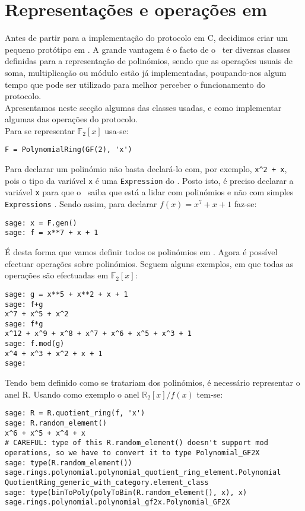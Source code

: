 \section{Representações e operações em \sage}
Antes de partir para a implementação do protocolo em \textsf{C}, decidimos criar um pequeno protótipo em \sage. A grande vantagem é o facto de o \sage\ ter diversas classes definidas para a representação de polinómios, sendo que as operações usuais de soma, multiplicação ou módulo estão já implementadas, poupando-nos algum tempo que pode ser utilizado para melhor perceber o funcionamento do protocolo. \\
Apresentamos neste secção algumas das classes usadas, e como implementar algumas das operações do protocolo.\\
Para se representar $\mathbb{F}_2[x]$ usa-se:
\begin{lstlisting}[style=sage]
F = PolynomialRing(GF(2), 'x')
\end{lstlisting}
Para declarar um polinómio não basta declará-lo com, por exemplo, \verb|x^2 + x|, pois o tipo da variável \verb|x| é uma \verb|Expression| do \sage. Posto isto, é preciso declarar a variável \verb|x| para que o \sage\ saiba que está a lidar com polinómios e não com simples \verb|Expressions| \sage. Sendo assim, para declarar $f(x) = x^7 + x + 1$ faz-se:
\begin{lstlisting}[style=sage]
sage: x = F.gen()
sage: f = x**7 + x + 1
\end{lstlisting}
É desta forma que vamos definir todos os polinómios em \sage. Agora é possível efectuar operações sobre polinómios. Seguem alguns exemplos, em que todas as operações são efectuadas em $\mathbb{F}_2[x]$:
\begin{lstlisting}[style=sage]
sage: g = x**5 + x**2 + x + 1
sage: f+g
x^7 + x^5 + x^2
sage: f*g
x^12 + x^9 + x^8 + x^7 + x^6 + x^5 + x^3 + 1
sage: f.mod(g)
x^4 + x^3 + x^2 + x + 1
sage: 
\end{lstlisting}
Tendo bem definido como se tratariam dos polinómios, é necessário representar o anel \textsf{R}. Usando como exemplo o anel $\mathbb{R}_2[x]/f(x)$ tem-se:
\begin{lstlisting}[style=sage]
sage: R = R.quotient_ring(f, 'x')
sage: R.random_element()
x^6 + x^5 + x^4 + x
# CAREFUL: type of this R.random_element() doesn't support mod operations, so we have to convert it to type Polynomial_GF2X
sage: type(R.random_element())
sage.rings.polynomial.polynomial_quotient_ring_element.Polynomial
QuotientRing_generic_with_category.element_class
sage: type(binToPoly(polyToBin(R.random_element(), x), x)
sage.rings.polynomial.polynomial_gf2x.Polynomial_GF2X
\end{lstlisting}
